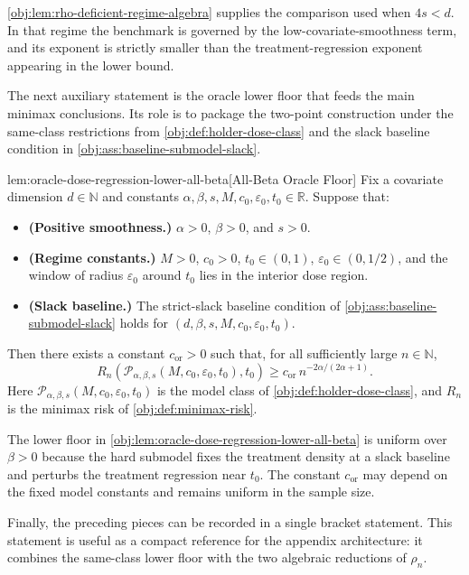 \cref{obj:lem:rho-deficient-regime-algebra} supplies the comparison used when \(4s<d\). In that regime the benchmark is governed by the low-covariate-smoothness term, and its exponent is strictly smaller than the treatment-regression exponent appearing in the lower bound.

The next auxiliary statement is the oracle lower floor that feeds the main minimax conclusions. Its role is to package the two-point construction under the same-class restrictions from \cref{obj:def:holder-dose-class} and the slack baseline condition in \cref{obj:ass:baseline-submodel-slack}.

\begin{lemmav}{lem:oracle-dose-regression-lower-all-beta}[All-Beta Oracle Floor]
Fix a covariate dimension $d\in\mathbb N$ and constants
$\alpha,\beta,s,M,c_0,\varepsilon_0,t_0\in\mathbb R$. Suppose that:
\begin{itemize}
\item \textbf{(Positive smoothness.)} $\alpha>0$, $\beta>0$, and $s>0$.
\item \textbf{(Regime constants.)} $M>0$, $c_0>0$, $t_0\in(0,1)$, $\varepsilon_0\in(0,1/2)$, and the window of radius $\varepsilon_0$ around $t_0$ lies in the interior dose region.
\item \textbf{(Slack baseline.)} The strict-slack baseline condition of \cref{obj:ass:baseline-submodel-slack} holds for $(d,\beta,s,M,c_0,\varepsilon_0,t_0)$.
\end{itemize}
Then there exists a constant $c_{\mathrm{or}}>0$ such that, for all sufficiently large $n\in\mathbb N$,
\[
R_n\!\left(\mathcal P_{\alpha,\beta,s}(M,c_0,\varepsilon_0,t_0),t_0\right)
\ge
c_{\mathrm{or}}\, n^{-2\alpha/(2\alpha+1)} .
\]
Here $\mathcal P_{\alpha,\beta,s}(M,c_0,\varepsilon_0,t_0)$ is the model class of \cref{obj:def:holder-dose-class}, and $R_n$ is the minimax risk of \cref{obj:def:minimax-risk}.
\end{lemmav}

The lower floor in \cref{obj:lem:oracle-dose-regression-lower-all-beta} is uniform over \(\beta>0\) because the hard submodel fixes the treatment density at a slack baseline and perturbs the treatment regression near \(t_0\). The constant \(c_{\mathrm{or}}\) may depend on the fixed model constants and remains uniform in the sample size.

Finally, the preceding pieces can be recorded in a single bracket statement. This statement is useful as a compact reference for the appendix architecture: it combines the same-class lower floor with the two algebraic reductions of \(\rho_n\).

